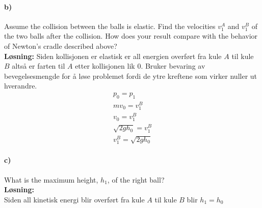 \documentclass[11pt, A4paper,norsk]{article}
\begin{document}
		\paragraph{b)}
			\begin{flushleft}
Assume the collision between the balls is elastic. Find the velocities $v^A_1$ and $v^B_1$ of the two balls after the collision. How does your result compare with the behavior of Newton’s cradle described above? \\
\vspace{1mm}
\textbf{Løsning:}
\vspace{1mm}
Siden kollisjonen er elastisk er all energien overført fra kule $A$ til kule $B$ altså er farten til $A$ etter kollisjonen lik $0$. Bruker bevaring av bevegelsesmengde for å løse problemet fordi de ytre kreftene som virker nuller ut hverandre.
				\begin{align}
p_0 = p_1 \nonumber \\
mv_0 = v_1^{B} \nonumber \\
v_0 = v_1^{B} \nonumber \\
\sqrt{2gh_0} = v_1^{B} \nonumber \\
v_1^B = \sqrt{2gh_0} \nonumber
				\end{align}
			\end{flushleft}















		\paragraph{c)}
			\begin{flushleft}
What is the maximum height, $h_1$, of the right ball? \\
\vspace{1mm}
\textbf{Løsning:} \\
\vspace{1mm}
Siden all kinetisk energi blir overført fra kule $A$ til kule $B$ blir $h_1 = h_0$
			\end{flushleft}
\end{document}
